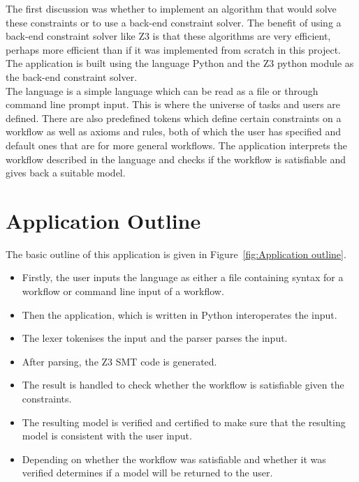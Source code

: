 \documentclass[a4paper]{report}
\begin{document}
The first discussion was whether to implement an algorithm that would solve these constraints or to use a back-end constraint solver. The benefit of using a back-end constraint solver like Z3 is that these algorithms are very efficient, perhaps more efficient than if it was implemented from scratch in this project. The application is built using the language  Python\cite{python} and the Z3 python module\cite{Z3Python} as the back-end constraint solver. \\

The language is a simple language which can be read as a file or through command line prompt input. This is where the universe of tasks and users are defined. There are also predefined tokens which define certain constraints on a workflow as well as axioms and rules, both of which the user has specified and default ones that are for more general workflows. The application interprets the workflow described in the language and checks if the workflow is satisfiable and gives back a suitable model.\\

\section{Application Outline}
The basic outline of this application is given in Figure~\ref{fig:Application outline}.
\begin{itemize}
\item Firstly, the user inputs the language as either a file containing syntax for a workflow or command line input of a workflow.
\item Then the application, which is written in Python interoperates the input.
\item The lexer tokenises the input and the parser parses the input.
\item After parsing, the Z3 SMT code is generated.
\item The result is handled to check whether the workflow is satisfiable given the constraints.
\item The resulting model is verified and certified to make sure that the resulting model is consistent with the user input.
\item Depending on whether the workflow was satisfiable and whether it was verified determines if a model will be returned to the user.
\end{itemize}
\end{document}
